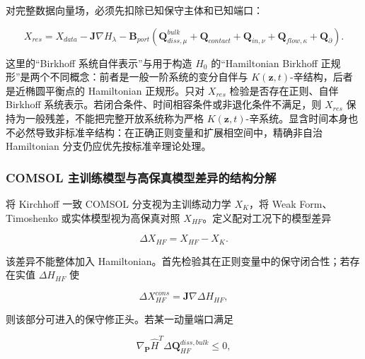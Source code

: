 对完整数据向量场，必须先扣除已知保守主体和已知端口：

\begin{equation}
\label{eq:hamiltonian-3-97}
\boxed{X_{res} = X_{data} - \mathbf{J}\nabla H_{\lambda} - \mathbf{B}_{port}\left( \mathbf{Q}_{diss,\mu}^{bulk} + \mathbf{Q}_{contact} + \mathbf{Q}_{in,\nu} + \mathbf{Q}_{flow,\kappa} + \mathbf{Q}_{\partial} \right).}
\end{equation}

这里的``Birkhoff 系统自伴表示''与用于构造 \(H_{0}\) 的``Hamiltonian Birkhoff 正规形''是两个不同概念：前者是一般一阶系统的变分自伴与 \(K\left( \mathbf{z},t \right)\)-辛结构，后者是近椭圆平衡点的 Hamiltonian 正规形。只对 \(X_{res}\) 检验是否存在正则、自伴 Birkhoff 系统表示。若闭合条件、时间相容条件或非退化条件不满足，则 \(X_{res}\) 保持为一般残差，不能把完整开放系统称为严格 \(K\left( \mathbf{z},t \right)\)-辛系统。显含时间本身也不必然导致非标准辛结构：在正确正则变量和扩展相空间中，精确非自治 Hamiltonian 分支仍应优先按标准辛理论处理。\cite{HairerLubichWanner2006GNI,FengQin2010}

\subsubsection{COMSOL 主训练模型与高保真模型差异的结构分解}\label{sec:hamiltonian-3-7-6}

将 Kirchhoff 一致 COMSOL 分支视为主训练动力学 \(X_{K}\)，将 Weak Form、Timoshenko 或实体模型视为高保真对照 \(X_{HF}\)。定义配对工况下的模型差异

\begin{equation}
\label{eq:hamiltonian-3-98}
\Delta X_{HF} = X_{HF} - X_{K}.
\end{equation}

该差异不能整体加入 Hamiltonian。首先检验其在正则变量中的保守闭合性；若存在实值 \(\Delta H_{HF}\) 使

\begin{equation}
\label{eq:hamiltonian-3-99}
\Delta X_{HF}^{cons} = \mathbf{J}\nabla\Delta H_{HF},
\end{equation}

则该部分可进入的保守修正头。若某一动量端口满足

\begin{equation}
\label{eq:hamiltonian-3-100}
\nabla_{\mathbf{P}}{\widehat{H}}^{T}\Delta\mathbf{Q}_{HF}^{diss,bulk} \leq 0,
\end{equation}

